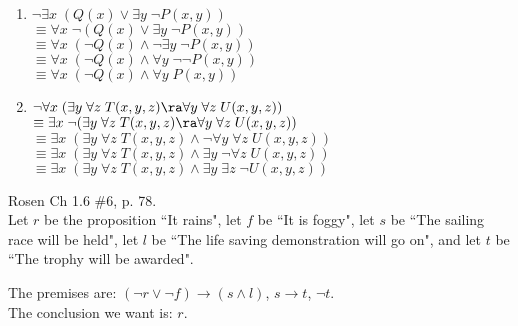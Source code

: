 \begin{questions}
\begin{solution}
\begin{enumerate}[label=(\alph*),itemsep=0pt,parsep=0pt,
        topsep=0pt,partopsep=0pt]
        \item $\neg \exists x\; (Q(x) \vee \exists y\; \neg P(x,y))$ \\
          $ \equiv \forall x\; \neg (Q(x) \vee \exists y\; \neg P(x,y))$ \\
          $ \equiv \forall x\; (\neg Q(x) \wedge \neg \exists y\; \neg P(x,y))$ \\
          $\equiv \forall x\; (\neg Q(x) \wedge \forall y\; \neg \neg P(x,y))$ \\
          $ \equiv \forall x\; (\neg Q(x) \wedge \forall y\; P(x,y))$ 
          
        \item $\neg \forall x\; (\exists y\; \forall z\; T(x,y,z) \ra \forall y\; \forall z\; U(x,y,z))$ \\
          $ \equiv \exists x\; \neg (\exists y\; \forall z\; T(x,y,z) \ra \forall y\; \forall z\; U(x,y,z))$ \\
          $ \equiv \exists x\; (\exists y\; \forall z\; T(x,y,z) \wedge \neg \forall y\; \forall z\; U(x,y,z))$ \\
          $ \equiv \exists x\; (\exists y\; \forall z\; T(x,y,z) \wedge \exists y\; \neg \forall z\; U(x,y,z))$ \\
          $ \equiv \exists x\; (\exists y\; \forall z\; T(x,y,z) \wedge \exists y\; \exists z\; \neg U(x,y,z))$ \\
      \end{enumerate}
  \end{solution}


 Rosen Ch 1.6 \#6, p. 78.\\
Let $r$ be the proposition ``It rains", let $f$ be ``It is foggy",
    let $s$ be ``The sailing race will be held", let $l$ be ``The life
    saving demonstration will go on", and let $t$ be ``The trophy will
    be awarded".
    \ifprintanswers
        \vspace{-10pt}
    \fi
\begin{solution}
    The premises are: $(\neg r \vee \neg f) \rightarrow (s \wedge l)$, $s \rightarrow t$, $\neg t$. \\
    The conclusion we want is: $r$.


\end{solution}
\end{questions}
